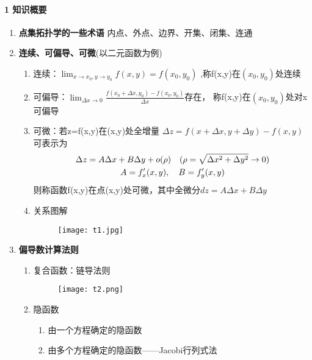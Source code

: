 \documentclass[12pt]{scrartcl}
\begin{document}
{\paragraph*{\large 1 知识概要}
\begin{enumerate}
    \item  \textbf{点集拓扑学的一些术语}
    \hspace*{0.7cm} 内点、外点、边界、开集、闭集、连通
    \item  \textbf{连续、可偏导、可微}(以二元函数为例)
    \begin{enumerate}
        \item 连续：$\lim_{x \to x_0,y\to y_0}f(x,y)=f(x_0,y_0)$
        ,称f(x,y)在$(x_0,y_0)$处连续
        \item 可偏导：$\lim_{\Delta x \to 0}
        \frac{f(x_0+\Delta x,y_0)-f(x_0,y_0)}{\Delta x}$存在，
        称f(x,y)在$(x_0,y_0)$处对x可偏导
        \item 可微：若z=f(x,y)在(x,y)处全增量
        $\Delta z=f(x+\Delta x,y+\Delta y)-f(x,y)$可表示为
        \begin{gather}
            \Delta z=A\Delta x+B\Delta y+o(\rho ) \quad
            (\rho=\sqrt{\Delta x^2+\Delta y^2}\rightarrow 0 )\notag\\
            A=f_x'(x,y),\quad B=f_y'(x,y)\notag
        \end{gather}
        则称函数f(x,y)在点(x,y)处可微，其中全微分$dz=A\Delta x+B\Delta y$
        \item 关系图解
        \begin{figure}[htbp]
            \centering
            \texttt{[image: t1.jpg]}
            \end{figure}
    \end{enumerate}
    \item  \textbf{偏导数计算法则}
    \begin{enumerate}
        \item 复合函数：链导法则
        \begin{figure}[htbp]
            \centering
            \texttt{[image: t2.png]}
            \end{figure}
        \item 隐函数
        \begin{enumerate}
            \item 由一个方程确定的隐函数
            \item 由多个方程确定的隐函数——Jacobi行列式法
        \end{enumerate}
    \end{enumerate}


\end{enumerate}}
\end{document}

